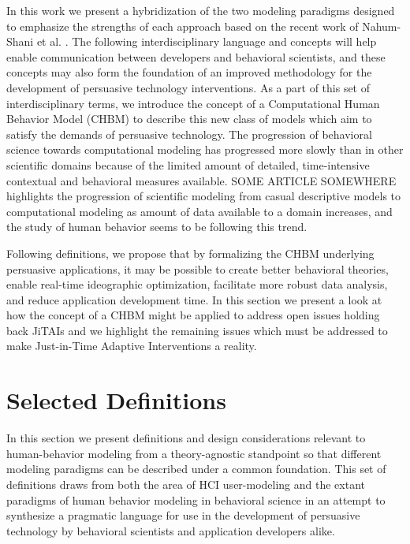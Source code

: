 \documentclass[runningheads,a4paper]{llncs}
\begin{document}
In this work we present a hybridization of the two modeling paradigms designed to emphasize the strengths of each approach based on the recent work of Nahum-Shani et al. \cite{nahum2014}.
The following interdisciplinary language and concepts will help enable communication between developers and behavioral scientists, and these concepts may also form the foundation of an improved methodology for the development of persuasive technology interventions.
As a part of this set of interdisciplinary terms, we introduce the concept of a Computational Human Behavior Model (CHBM) to describe this new class of models which aim to satisfy the demands of persuasive technology.
The progression of behavioral science towards computational modeling has progressed more slowly than in other scientific domains because of the limited amount of detailed, time-intensive contextual and behavioral measures available.
SOME ARTICLE SOMEWHERE highlights the progression of scientific modeling from casual descriptive models to computational modeling as amount of data available to a domain increases, and the study of human behavior seems to be following this trend. \cite{THAT ONE ARTICLE}

Following definitions, we propose that by formalizing the CHBM underlying persuasive applications, it may be possible to create better behavioral theories, enable real-time ideographic optimization, facilitate more robust data analysis, and reduce application development time. 
In this section we present a look at how the concept of a CHBM might be applied to address open issues holding back JiTAIs and we highlight the remaining issues which must be addressed to make Just-in-Time Adaptive Interventions a reality.

\section{Selected Definitions}
In this section we present definitions and design considerations relevant to human-behavior modeling from a theory-agnostic standpoint so that different modeling paradigms can be described under a common foundation.
This set of definitions draws from both the area of HCI user-modeling and the extant paradigms of human behavior modeling in behavioral science in an attempt to synthesize a pragmatic language for use in the development of persuasive technology by behavioral scientists and application developers alike.
\end{document}
